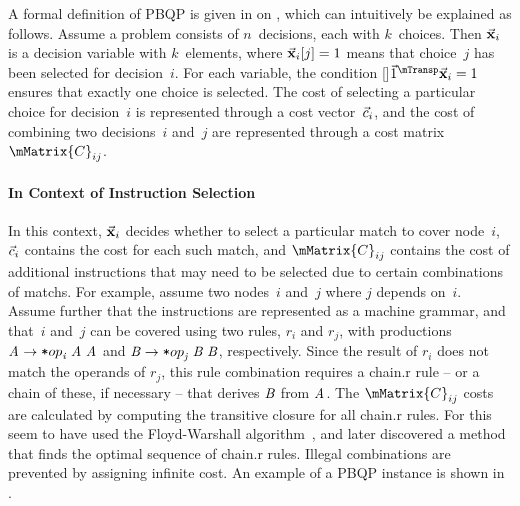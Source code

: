 A formal definition of \gls{PBQP} is given in
 on ,
which can intuitively be explained as follows.
%
Assume a problem consists of $n$~decisions, each with $k$~choices.
%
Then $\mVector{\mVar{x}}_i$ is a \gls{decision variable} with $k$~elements,
where \mbox{$\mVector{\mVar{x}}_i[j] = 1$} means that choice~$j$ has been
selected for decision~\mbox{$i$\hspace{-.8pt}.}
%
For each \gls{variable}, the condition
\raisebox{0pt}[\height-2pt]{$\mVector{1}^{\mTransp} \mVector{\mVar{x}}_i = 1$}
ensures that exactly one choice is selected.
%
The cost of selecting a particular choice for decision~$i$ is represented
through a cost vector~$\vec{c}_i$, and the cost of combining two
decisions~$i$ and~$j$ are represented through a cost matrix~$\mMatrix{C}_{ij}$.


\paragraph{In Context of Instruction Selection}

In this context, $\mVector{\mVar{x}}_i$ decides whether to select a particular
\gls{match} to cover \gls{node}~$i$, $\vec{c}_i$ contains the cost for each
such \gls{match}, and $\mMatrix{C}_{ij}$ contains the cost of additional
\glspl{instruction} that may need to be selected due to certain combinations of
\glspl{match}.
%
For example, assume two nodes~$i$ and~$j$ where $j$ depends
on~\mbox{$i$\hspace{-.8pt}.}
%
Assume further that the \glspl{instruction} are represented as a
 \gls{machine grammar}, and that~$i$ and~$j$ can be
covered using two \glspl{rule}, $r_i$ and $r_j$, with \glspl{production}
\mbox{$\mNT{A} \rightarrow \irCode*{op}_{\mathit{i}} \; \mNT{A} \; \mNT{A}$} and
\mbox{$\mNT{B} \rightarrow \irCode*{op}_{\mathit{j}} \; \mNT{B} \; \mNT{B}$},
respectively.
%
Since the result of $r_i$ does not match the operands of $r_j$, this \gls{rule}
combination requires a \gls{chain.r} \gls{rule} -- or a chain of these, if
necessary -- that derives $\mNT{B}$ from $\mNT{A}$.
%
The $\mMatrix{C}_{ij}$ costs are calculated by computing the \gls{transitive
  closure} for all \gls{chain.r} \glspl{rule}.
%
For this \citeauthor{EcksteinEtAl:2003} seem to have used the Floyd-Warshall
algorithm~\cite{Floyd:1962}, and \textcite{SchaeferScholz:2007} later discovered
a method that finds the optimal sequence of \gls{chain.r} \glspl{rule}.
%
Illegal combinations are prevented by assigning infinite cost.
%
An example of a \gls{PBQP} instance is shown in .

